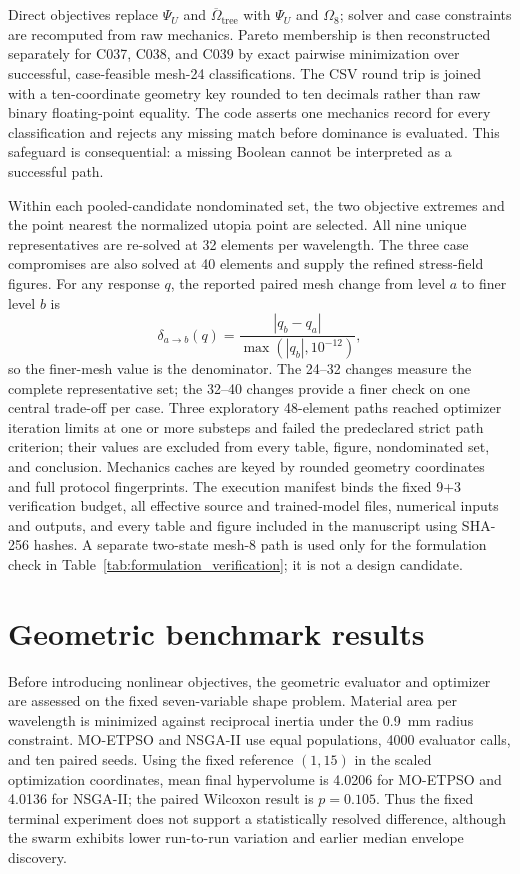 \documentclass[11pt]{article}
\newcommand{\PsiU}{\Psi_{U}}
\newcommand{\Om}{\Omega_{8}}
\begin{document}
Direct objectives replace $\widehat\Psi_U$ and $\overline\Omega_{\mathrm{tree}}$ with $\PsiU$ and $\Om$; solver and case constraints are recomputed from raw mechanics. Pareto membership is then reconstructed separately for C037, C038, and C039 by exact pairwise minimization over successful, case-feasible mesh-24 classifications. The CSV round trip is joined with a ten-coordinate geometry key rounded to ten decimals rather than raw binary floating-point equality. The code asserts one mechanics record for every classification and rejects any missing match before dominance is evaluated. This safeguard is consequential: a missing Boolean cannot be interpreted as a successful path.

Within each pooled-candidate nondominated set, the two objective extremes and the point nearest the normalized utopia point are selected. All nine unique representatives are re-solved at 32 elements per wavelength. The three case compromises are also solved at 40 elements and supply the refined stress-field figures. For any response $q$, the reported paired mesh change from level $a$ to finer level $b$ is
\begin{equation}
\delta_{a\rightarrow b}(q)=
\frac{|q_b-q_a|}{\max(|q_b|,10^{-12})},
\label{eq:mesh_change}
\end{equation}
so the finer-mesh value is the denominator. The 24--32 changes measure the complete representative set; the 32--40 changes provide a finer check on one central trade-off per case. Three exploratory 48-element paths reached optimizer iteration limits at one or more substeps and failed the predeclared strict path criterion; their values are excluded from every table, figure, nondominated set, and conclusion. Mechanics caches are keyed by rounded geometry coordinates and full protocol fingerprints. The execution manifest binds the fixed 9+3 verification budget, all effective source and trained-model files, numerical inputs and outputs, and every table and figure included in the manuscript using SHA-256 hashes. A separate two-state mesh-8 path is used only for the formulation check in Table~\ref{tab:formulation_verification}; it is not a design candidate.



\section{Geometric benchmark results}

Before introducing nonlinear objectives, the geometric evaluator and optimizer are assessed on the fixed seven-variable shape problem. Material area per wavelength is minimized against reciprocal inertia under the 0.9~mm radius constraint. MO-ETPSO and NSGA-II use equal populations, 4000 evaluator calls, and ten paired seeds. Using the fixed reference $(1,15)$ in the scaled optimization coordinates, mean final hypervolume is 4.0206 for MO-ETPSO and 4.0136 for NSGA-II; the paired Wilcoxon result is $p=0.105$. Thus the fixed terminal experiment does not support a statistically resolved difference, although the swarm exhibits lower run-to-run variation and earlier median envelope discovery.
\end{document}
